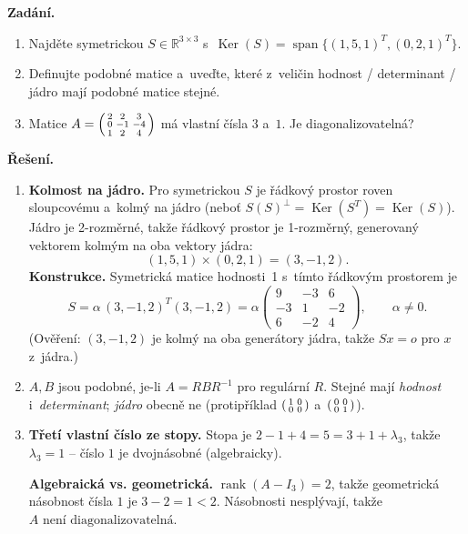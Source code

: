 \documentclass[11pt,a4paper]{article}
\newcommand{\rank}{\operatorname{rank}}
\newcommand{\Ker}{\operatorname{Ker}}
\newcommand{\spn}{\operatorname{span}}
\begin{document}
\begin{priklad} \par
\textbf{Zadání.}
\begin{enumerate}[label=(\arabic*)]
  \item Najděte symetrickou $S\in\mathbb{R}^{3\times3}$ s~$\Ker(S)=\spn\{(1,5,1)^T,(0,2,1)^T\}$.
  \item Definujte podobné matice a~uveďte, které z~veličin hodnost / determinant / jádro mají podobné matice stejné.
  \item Matice $A=\begin{psmallmatrix}2&2&3\\0&-1&-4\\1&2&4\end{psmallmatrix}$ má vlastní čísla $3$ a~$1$. Je diagonalizovatelná?
\end{enumerate}

\textbf{Řešení.}
\begin{enumerate}[label=(\arabic*)]
  \item \textbf{Kolmost na jádro.} Pro symetrickou $S$ je řádkový prostor roven sloupcovému a~kolmý na jádro (neboť $S(S)^\perp=\Ker(S^T)=\Ker(S)$). Jádro je 2-rozměrné, takže řádkový prostor je 1-rozměrný, generovaný vektorem kolmým na oba vektory jádra:
    \[ (1,5,1)\times(0,2,1)=(3,-1,2). \]
    \textbf{Konstrukce.} Symetrická matice hodnosti~1 s~tímto řádkovým prostorem je
    \[ S=\alpha\,(3,-1,2)^T(3,-1,2)=\alpha\begin{pmatrix}9&-3&6\\-3&1&-2\\6&-2&4\end{pmatrix},\qquad \alpha\neq0. \]
    (Ověření: $(3,-1,2)$ je kolmý na oba generátory jádra, takže $Sx=o$ pro $x$ z~jádra.)
  \item $A,B$ jsou podobné, je-li $A=RBR^{-1}$ pro regulární $R$. Stejné mají \emph{hodnost} i~\emph{determinant}; \emph{jádro} obecně ne (protipříklad $\begin{psmallmatrix}1&0\\0&0\end{psmallmatrix}$ a~$\begin{psmallmatrix}0&0\\0&1\end{psmallmatrix}$).
  \item \textbf{Třetí vlastní číslo ze stopy.} Stopa je $2-1+4=5=3+1+\lambda_3$, takže $\lambda_3=1$ -- číslo $1$ je dvojnásobné (algebraicky).\par
    \textbf{Algebraická vs. geometrická.} $\rank(A-I_3)=2$, takže geometrická násobnost čísla $1$ je $3-2=1<2$. Násobnosti nesplývají, takže $\boxed{A\text{ není diagonalizovatelná}}$.
\end{enumerate}
\end{priklad}
\end{document}
